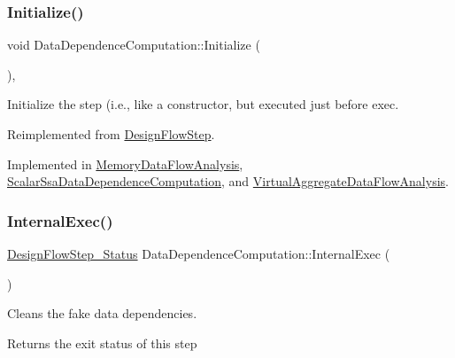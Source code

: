 \subsubsection{\texorpdfstring{Initialize()}{Initialize()}}
{\footnotesize\ttfamily void Data\+Dependence\+Computation\+::\+Initialize (\begin{DoxyParamCaption}{ }\end{DoxyParamCaption})\hspace{0.3cm}{\ttfamily [override]}, {}}



Initialize the step (i.\+e., like a constructor, but executed just before exec. 



Reimplemented from \hyperlink{classDesignFlowStep_a44b50683382a094976e1d432a7784799}{Design\+Flow\+Step}.



Implemented in \hyperlink{classMemoryDataFlowAnalysis_a7c26b870182fa981eab5056955fd89d9}{Memory\+Data\+Flow\+Analysis}, \hyperlink{classScalarSsaDataDependenceComputation_a16de581136910ae27dca6599125d3067}{Scalar\+Ssa\+Data\+Dependence\+Computation}, and \hyperlink{classVirtualAggregateDataFlowAnalysis_acafa9a90b201923d66a16fea72ccc9ac}{Virtual\+Aggregate\+Data\+Flow\+Analysis}.

\mbox{\label{classDataDependenceComputation_a573697b6cf02065e9365aee8e208fdc1}} 
\subsubsection{\texorpdfstring{Internal\+Exec()}{InternalExec()}}
{\footnotesize\ttfamily \hyperlink{design__flow__step_8hpp_afb1f0d73069c26076b8d31dbc8ebecdf}{Design\+Flow\+Step\+\_\+\+Status} Data\+Dependence\+Computation\+::\+Internal\+Exec (\begin{DoxyParamCaption}{ }\end{DoxyParamCaption})\hspace{0.3cm}{\ttfamily [virtual]}}



Cleans the fake data dependencies. 

\begin{DoxyReturn}{Returns}
the exit status of this step 
\end{DoxyReturn}


